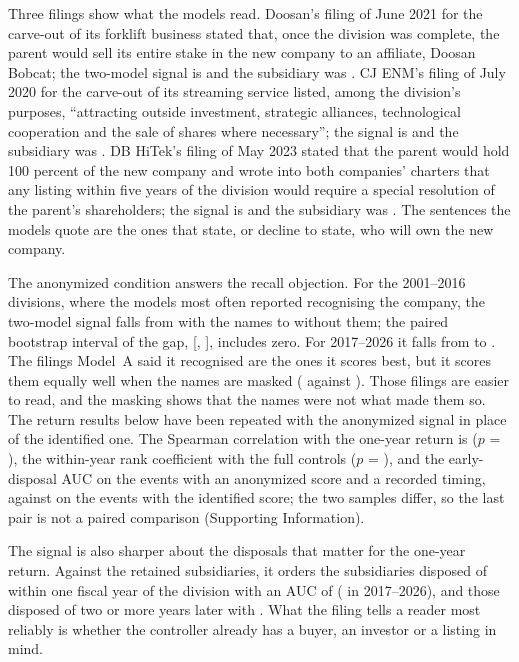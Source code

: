 Three filings show what the models read. Doosan's filing of June 2021 for the carve-out of its forklift business stated that, once the division was complete, the parent would sell its entire stake in the new company to an affiliate, Doosan Bobcat; the two-model signal is \ExDoosanScore{} and the subsidiary was \ExDoosanOutcome{}. CJ ENM's filing of July 2020 for the carve-out of its streaming service listed, among the division's purposes, ``attracting outside investment, strategic alliances, technological cooperation and the sale of shares where necessary''; the signal is \ExTvingScore{} and the subsidiary was \ExTvingOutcome{}. DB HiTek's filing of May 2023 stated that the parent would hold 100 percent of the new company and wrote into both companies' charters that any listing within five years of the division would require a special resolution of the parent's shareholders; the signal is \ExDBScore{} and the subsidiary was \ExDBOutcome{}. The sentences the models quote are the ones that state, or decline to state, who will own the new company.

The anonymized condition answers the recall objection. For the 2001--2016 divisions, where the models most often reported recognising the company, the two-model signal falls from \AUCOldIdent{} with the names to \AUCOldAnon{} without them; the paired bootstrap interval of the gap, [\GapOldLo, \GapOldHi], includes zero. For 2017--2026 it falls from \AUCNewIdent{} to \AUCNewAnon. The filings Model~A said it recognised are the ones it scores best, but it scores them equally well when the names are masked (\AUCClaudeFlaggedAnonOld{} against \AUCClaudeFlaggedIdentOld{}). Those filings are easier to read, and the masking shows that the names were not what made them so. The return results below have been repeated with the anonymized signal in place of the identified one. The Spearman correlation with the one-year return is \SpearmanAnon{} ($p$ = \SpearmanAnonP), the within-year rank coefficient with the full controls \RankAnonCoef{} ($p$ = \RankAnonP), and the early-disposal AUC \AUCEarlyAnon{} on the \NAUCEarlyAnon{} events with an anonymized score and a recorded timing, against \AUCEarlyPooled{} on the \NAUCEarly{} events with the identified score; the two samples differ, so the last pair is not a paired comparison (Supporting Information).

The signal is also sharper about the disposals that matter for the one-year return. Against the retained subsidiaries, it orders the subsidiaries disposed of within one fiscal year of the division with an AUC of \AUCEarlyPooled{} (\AUCEarlyNew{} in 2017--2026), and those disposed of two or more years later with \AUCLateVsNever. What the filing tells a reader most reliably is whether the controller already has a buyer, an investor or a listing in mind.

